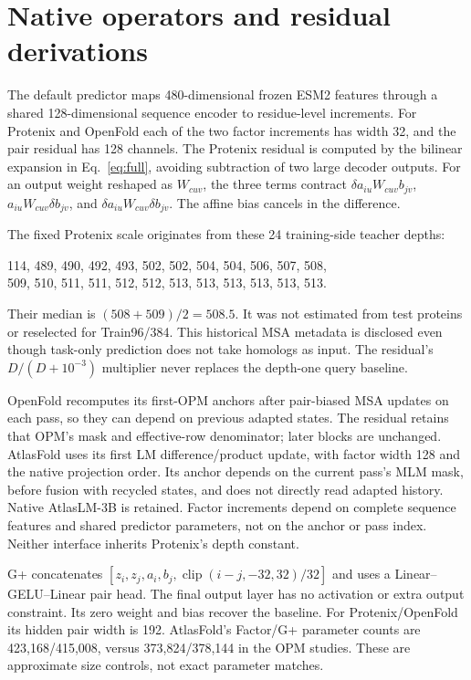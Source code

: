 \section{Native operators and residual derivations}
\label{app:operators}
The default predictor maps 480-dimensional frozen ESM2 features through a shared
128-dimensional sequence encoder to residue-level increments. For Protenix and
OpenFold each of the two factor increments has width 32, and the pair residual
has 128 channels. The Protenix residual is computed by the bilinear expansion
in Eq.~\ref{eq:full}, avoiding subtraction of two large decoder outputs.
For an output weight reshaped as $W_{cuv}$, the three terms contract
$\delta a_{iu}W_{cuv}b_{jv}$, $a_{iu}W_{cuv}\delta b_{jv}$, and
$\delta a_{iu}W_{cuv}\delta b_{jv}$. The affine bias cancels in the difference.

The fixed Protenix scale originates from these 24 training-side teacher depths:
\begin{center}\small
114, 489, 490, 492, 493, 502, 502, 504, 504, 506, 507, 508,\\
509, 510, 511, 511, 512, 512, 513, 513, 513, 513, 513, 513.
\end{center}
Their median is $(508+509)/2=508.5$. It was not estimated from test proteins
or reselected for Train96/384. This historical MSA metadata is disclosed even
though task-only prediction does not take homologs as input. The residual's
$D/(D+10^{-3})$ multiplier never replaces the depth-one query baseline.

OpenFold recomputes its first-OPM anchors after pair-biased MSA updates on
each pass, so they can depend on previous adapted states. The residual
retains that OPM's mask and effective-row denominator; later blocks are
unchanged. AtlasFold uses its first LM difference/product update, with
factor width 128 and the native projection order. Its anchor depends on the
current pass's MLM mask, before fusion with recycled states, and does not
directly read adapted history. Native AtlasLM-3B is retained. Factor increments
depend on complete sequence features and shared predictor parameters, not on
the anchor or pass index. Neither interface inherits Protenix's depth constant.

G+ concatenates $[z_i,z_j,a_i,b_j,\operatorname{clip}(i-j,-32,32)/32]$ and
uses a Linear--GELU--Linear pair head. The final output layer has no activation
or extra output constraint. Its zero weight and bias recover the baseline.
For Protenix/OpenFold its hidden pair width is 192. AtlasFold's Factor/G+
parameter counts are 423,168/415,008, versus 373,824/378,144 in the OPM studies.
These are approximate size controls, not exact parameter matches.

